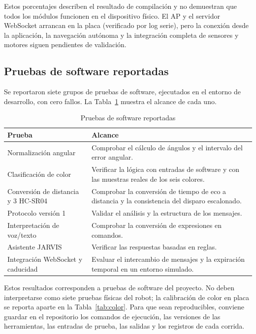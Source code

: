 \documentclass[journal]{IEEEtran}
\begin{document}
Estos porcentajes describen el resultado de compilación y no demuestran que todos los módulos funcionen en el dispositivo físico. El AP y el servidor WebSocket arrancan en la placa (verificado por log serie), pero la conexión desde la aplicación, la navegación autónoma y la integración completa de sensores y motores siguen pendientes de validación.

\subsection{Pruebas de software reportadas}

Se reportaron siete grupos de pruebas de software, ejecutados en el entorno de desarrollo, con cero fallos. La Tabla~\ref{tab:pruebas} muestra el alcance de cada uno.

\begin{table}[t]
\centering
\caption{Pruebas de software reportadas}
\label{tab:pruebas}
\scriptsize
\begin{tabular}{p{} p{}}
\toprule
\textbf{Prueba} & \textbf{Alcance} \\
\midrule
Normalización angular & Comprobar el cálculo de ángulos y el intervalo del error angular. \\
Clasificación de color & Verificar la lógica con entradas de software y con las muestras reales de los seis colores. \\
Conversión de distancia y 3 HC-SR04 & Comprobar la conversión de tiempo de eco a distancia y la consistencia del disparo escalonado. \\
Protocolo versión 1 & Validar el análisis y la estructura de los mensajes. \\
Interpretación de voz/texto & Comprobar la conversión de expresiones en comandos. \\
Asistente JARVIS & Verificar las respuestas basadas en reglas. \\
Integración WebSocket y caducidad & Evaluar el intercambio de mensajes y la expiración temporal en un entorno simulado. \\
\bottomrule
\end{tabular}
\end{table}

Estos resultados corresponden a pruebas de software del proyecto. No deben interpretarse como siete pruebas físicas del robot; la calibración de color en placa se reporta aparte en la Tabla~\ref{tab:color}. Para que sean reproducibles, conviene guardar en el repositorio los comandos de ejecución, las versiones de las herramientas, las entradas de prueba, las salidas y los registros de cada corrida.
\end{document}
